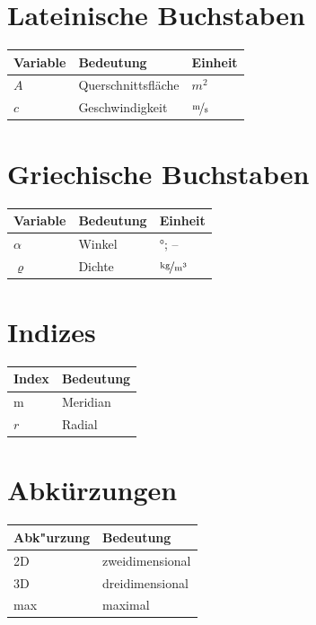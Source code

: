 \documentclass[bachelor,       %
               twoside,        %
               BCOR10mm,       %
               ngerman,english  %
               ]{GAUBM}
\newcommand{\tabheadfont}[1]{\textbf{#1}} %
\begin{document}
\cleardoublepage
\onehalfspacing
\tableofcontents

\begin{nomenclature}
\section*{Lateinische Buchstaben}
\noindent
\begin{longtable}[l]{p{}p{}p{}}
  \tabheadfont{Variable}&\tabheadfont{Bedeutung}&\tabheadfont{Einheit}\\\midrule\endhead
  $A$ & Querschnittsfl{\"a}che & $\unit{m^2}$\\
  $c$ & Geschwindigkeit & $\unitfrac{m}{s}$
\end{longtable}
\section*{Griechische Buchstaben}
\begin{longtable}[l]{p{}p{}p{}}
  \tabheadfont{Variable}&\tabheadfont{Bedeutung}&\tabheadfont{Einheit}\\\midrule\endhead
  $\alpha$  & Winkel & $\unit{\degree}$; --\\
  $\varrho$ & Dichte & $\unitfrac{kg}{m^3}$
\end{longtable}
\section*{Indizes}
\begin{longtable}[l]{p{}p{}}
  \tabheadfont{Index}&\tabheadfont{Bedeutung}\\\midrule\endhead
  m & Meridian\\
  $r$ & Radial
\end{longtable}
\section*{Abk{\"u}rzungen}
\begin{longtable}[l]{p{}p{}}
  \tabheadfont{Abk"urzung}&\tabheadfont{Bedeutung}\\\midrule\endhead
  2D & zweidimensional\\
  3D & dreidimensional\\
  max & maximal
\end{longtable}
\end{nomenclature}
\end{document}
